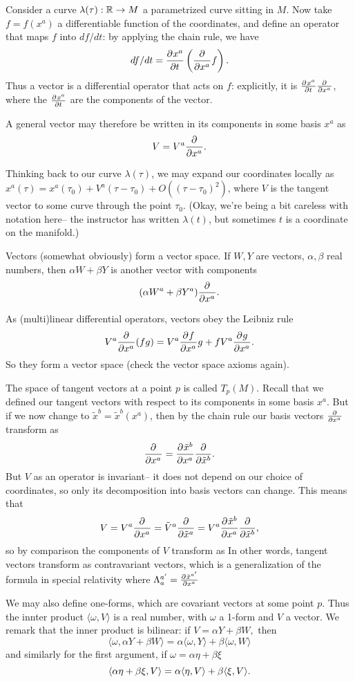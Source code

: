 Consider a curve $\lambda(\tau):\RR\to M$ a parametrized curve sitting in $M$. Now take $f=f(x^a)$ a differentiable function of the coordinates, and define an operator that maps $f$ into $df/dt$: by applying the chain rule, we have
$$df/dt=\P{x^a}{t}\left(\P{}{x^a}f\right).$$
Thus a vector is a differential operator that acts on $f$: explicitly, it is $\P{x^a}{t}\P{}{x^a}$, where the $\P{x^a}{t}$ are the components of the vector.

A general vector may therefore be written in its components in some basis $x^a$ as
$$V= V^a \P{}{x^a}.$$

Thinking back to our curve $\lambda(\tau)$, we may expand our coordinates locally as $x^a(\tau)=x^a (\tau_0)+V^a (\tau-\tau_0)+O((\tau-\tau_0)^2)$, where $V$ is the tangent vector to some curve through the point $\tau_0$. (Okay, we're being a bit careless with notation here-- the instructor has written $\lambda(t)$, but sometimes $t$ is a coordinate on the manifold.)

Vectors (somewhat obviously) form a vector space. If $W, Y$ are vectors, $\alpha,\beta$ real numbers, then $\alpha W + \beta Y$ is another vector with components
$$(\alpha W^a+\beta Y^a)\P{}{x^a}.$$

As (multi)linear differential operators, vectors obey the Leibniz rule
$$V^a \P{}{x^a}(fg)= V^a \P{f}{x^a} g+ f V^a \P{g}{x^a}.$$
So they form a vector space (check the vector space axioms again).

The space of tangent vectors at a point $p$ is called $T_p(M)$. Recall that we defined our tangent vectors with respect to its components in some basis $x^a$. But if we now change to $\tilde x^b = \tilde x^b(x^a)$, then by the chain rule our basis vectors $\P{}{x^a}$ transform as
$$\P{}{x^a}=\P{\tilde x^{b}}{x^a}\frac{\partial}{\partial \tilde x^b}.$$
But $V$ as an operator is invariant-- it does not depend on our choice of coordinates, so only its decomposition into basis vectors can change. This means that
$$V=V^a \P{}{x^a}=\tilde V^a \frac{\p}{\p\tilde x^a} = V^a \P{\tilde x^b}{x^a}\frac{\p}{\p\tilde x^b},$$
so by comparison the components of $V$ transform as
In other words, tangent vectors transform as contravariant vectors, which is a generalization of the formula in special relativity where $\Lambda^{a'}_{a} = \P{\tilde x^{a'}}{x^a}$

\begin{defn}
We may also define one-forms, which are covariant vectors at some point $p$. Thus the innter product $\langle \omega, V\rangle$ is a real number, with $\omega$ a 1-form and $V$ a vector. We remark that the inner product is bilinear:
if $V=\alpha Y + \beta W,$ then
$$\langle \omega, \alpha Y + \beta W\rangle = \alpha\langle \omega, Y\rangle +\beta \langle \omega, W\rangle$$
and similarly for the first argument, if $\omega = \alpha \eta+\beta \xi$
$$\ang{\alpha \eta +\beta\xi, V} = \alpha \ang{\eta, V} +\beta \ang{\xi, V}.$$
\end{defn}

